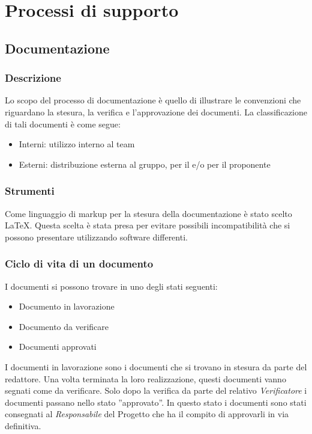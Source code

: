 
\section{Processi di supporto}
\subsection{Documentazione}
\subsubsection{Descrizione }
Lo scopo del processo di documentazione è quello di illustrare le
convenzioni che riguardano la stesura, la verifica e l’approvazione
dei documenti. La classificazione di tali documenti è come segue: 
\begin{itemize} 
\item Interni: utilizzo interno al team
\item Esterni: distribuzione esterna al gruppo, per il  e/o per il proponente
\end{itemize}

\subsubsection{Strumenti}

Come linguaggio di markup per la stesura della documentazione  è stato
scelto \LaTeX. Questa scelta è stata presa per evitare possibili
incompatibilità che si possono presentare utilizzando software
differenti. 

\subsubsection{Ciclo di vita di un documento}

I documenti si possono trovare in uno degli stati seguenti:
\begin{itemize}
\item Documento in lavorazione
\item Documento da verificare
\item Documenti approvati
\end{itemize}

I documenti in lavorazione sono i documenti che si trovano in stesura
da parte del redattore. Una volta terminata la loro realizzazione,
questi documenti vanno segnati come da verificare.
Solo dopo la verifica da parte 
del relativo  \emph{Verificatore}  i documenti passano nello stato 
''approvato''. In questo stato i documenti sono stati consegnati al
 \emph{Responsabile}  del Progetto che ha il compito di approvarli in via
definitiva. 

